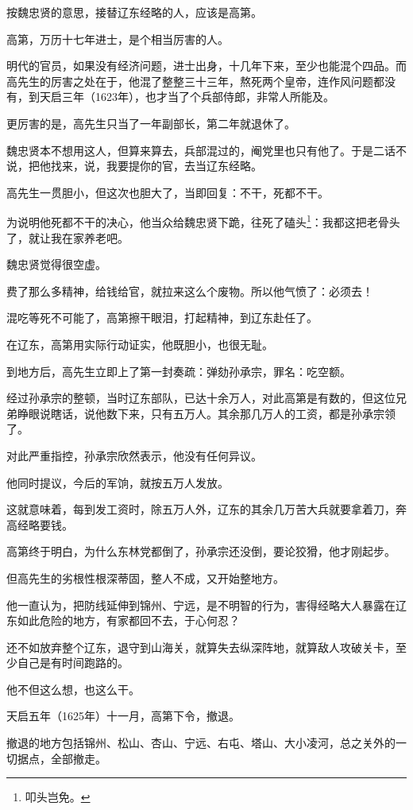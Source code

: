 \begin{multicols}{\theparacolNo}
		按魏忠贤的意思，接替辽东经略的人，应该是高第。

		高第，万历十七年进士，是个相当厉害的人。

		明代的官员，如果没有经济问题，进士出身，十几年下来，至少也能混个四品。而高先生的厉害之处在于，他混了整整三十三年，熬死两个皇帝，连作风问题都没有，到天启三年（1623年），也才当了个兵部侍郎，非常人所能及。

		更厉害的是，高先生只当了一年副部长，第二年就退休了。

		魏忠贤本不想用这人，但算来算去，兵部混过的，阉党里也只有他了。于是二话不说，把他找来，说，我要提你的官，去当辽东经略。

		高先生一贯胆小，但这次也胆大了，当即回复：不干，死都不干。

		为说明他死都不干的决心，他当众给魏忠贤下跪，往死了磕头\footnote{叩头岂免。}：我都这把老骨头了，就让我在家养老吧。

		魏忠贤觉得很空虚。

		费了那么多精神，给钱给官，就拉来这么个废物。所以他气愤了：必须去！

		混吃等死不可能了，高第擦干眼泪，打起精神，到辽东赴任了。

		在辽东，高第用实际行动证实，他既胆小，也很无耻。

		到地方后，高先生立即上了第一封奏疏：弹劾孙承宗，罪名：吃空额。

		经过孙承宗的整顿，当时辽东部队，已达十余万人，对此高第是有数的，但这位兄弟睁眼说瞎话，说他数下来，只有五万人。其余那几万人的工资，都是孙承宗领了。

		对此严重指控，孙承宗欣然表示，他没有任何异议。

		他同时提议，今后的军饷，就按五万人发放。

		这就意味着，每到发工资时，除五万人外，辽东的其余几万苦大兵就要拿着刀，奔高经略要钱。

		高第终于明白，为什么东林党都倒了，孙承宗还没倒，要论狡猾，他才刚起步。

		但高先生的劣根性根深蒂固，整人不成，又开始整地方。

		他一直认为，把防线延伸到锦州、宁远，是不明智的行为，害得经略大人暴露在辽东如此危险的地方，有家都回不去，于心何忍？

		还不如放弃整个辽东，退守到山海关，就算失去纵深阵地，就算敌人攻破关卡，至少自己是有时间跑路的。

		他不但这么想，也这么干。

		天启五年（1625年）十一月，高第下令，撤退。

		撤退的地方包括锦州、松山、杏山、宁远、右屯、塔山、大小凌河，总之关外的一切据点，全部撤走。


\end{multicols}
